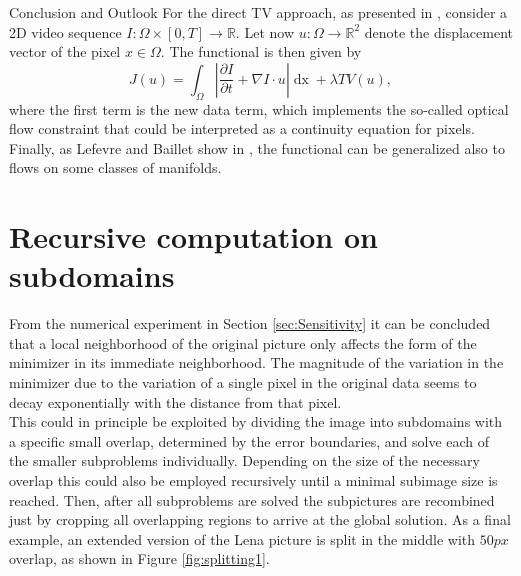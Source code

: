 \begin{chapter}{Conclusion and Outlook}
For the direct TV approach, as presented in \cite{SceneFlow}, consider a 2D video sequence $I:\Omega\times [0,T]\to\mathbb{R}$.
Let now $u:\Omega\to\mathbb{R}^2$ denote the displacement vector of the pixel $x\in\Omega$. The functional is then given by
\begin{equation}
    J(u)=\int_{\Omega}\left\vert\frac{\partial I}{\partial t}+\nabla I\cdot u\right\vert\mathop{dx}+\lambda TV(u),
\end{equation}
where the first term is the new data term, which implements the so-called optical flow constraint that could be interpreted as a continuity equation for pixels.
Finally, as Lefevre and Baillet show in \cite{manifoldFlow}, the functional can be generalized also to flows on some classes of manifolds.


\section{Recursive computation on subdomains} %
\label{sec:Recursivecomputationonsubdomains}
From the numerical experiment in Section \ref{sec:Sensitivity} it can be concluded that a local neighborhood of the original picture only affects the form of the minimizer 
in its immediate neighborhood. The magnitude of the variation in the minimizer due to the variation of a single pixel in the original data seems to decay exponentially with the
distance from that pixel. \\

This could in principle be exploited by dividing the image into subdomains with a specific small overlap, determined by the error boundaries, and solve each of the smaller 
subproblems individually. Depending on the size of the necessary overlap this could also be employed recursively until a minimal subimage size is reached. Then, after all subproblems
are solved the subpictures are recombined just by cropping all overlapping regions to arrive at the global solution.
As a final example, an extended version of the Lena picture is split in the middle with $50px$ overlap, as shown in Figure \ref{fig:splitting1}.


\end{chapter}
